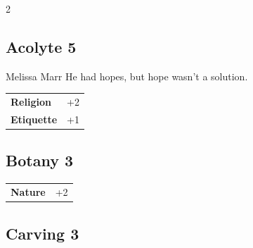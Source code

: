 \begin{multicols}{2}
\begin{tcolorbox}

\end{tcolorbox}

\begin{tcolorbox}
    \subsection*{Acolyte \hfill \small{5 }}
    \tcblower


\begin{pquote}{Melissa Marr}
He had hopes, but hope wasn't a solution.
\end{pquote}

\vspace{3mm}

\begin{tabular}{@{}ll@{}}
    \textbf{Religion} & +2\\
    \textbf{Etiquette} & +1\\
\end{tabular}


\end{tcolorbox}

\begin{tcolorbox}
    \subsection*{Botany \hfill \small{3 }}
    \tcblower




\begin{tabular}{@{}ll@{}}
    \textbf{Nature} & +2\\
\end{tabular}


\end{tcolorbox}

\begin{tcolorbox}
    \subsection*{Carving \hfill \small{3 }}
    \tcblower





\end{tcolorbox}
\end{multicols}
